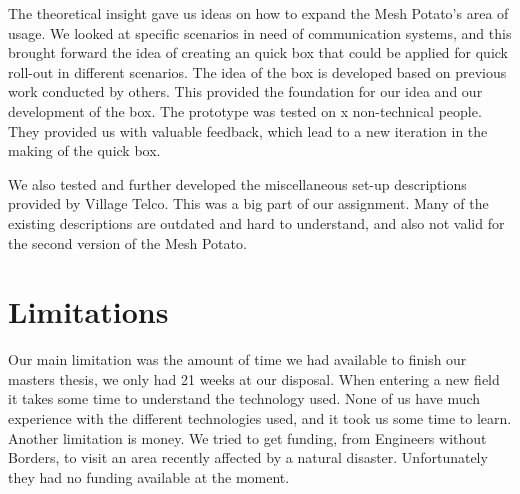 The theoretical insight gave us ideas on how to expand the Mesh Potato's area of usage. We looked at specific scenarios in need of communication systems, and this brought forward the idea of creating an \gls{quick} box that could be applied for quick roll-out in different scenarios. The idea of the box is developed based on previous work conducted by others. This provided the foundation for our idea and our development of the box. The prototype was tested on x non-technical people. They provided us with valuable feedback, which lead to a new iteration in the making of the \gls{quick} box. 

We also tested and further developed the miscellaneous set-up descriptions provided by Village Telco. This was a big part of our assignment. Many of the existing descriptions are outdated and hard to understand, and also not valid for the second version of the Mesh Potato.



\section{Limitations}
Our main limitation was the amount of time we had available to finish our masters thesis, we only had 21 weeks at our disposal. When entering a new field it takes some time to understand the technology used. None of us have much experience with the different technologies used, and it took us some time to learn. Another limitation is money. We tried to get funding, from Engineers without Borders, to visit an area recently affected by a natural disaster. Unfortunately they had no funding available at the moment.


